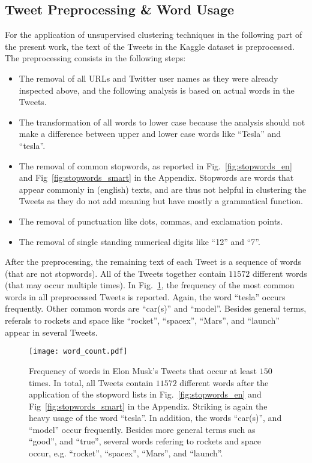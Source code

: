 \subsection{Tweet Preprocessing \& Word Usage}

For the application of unsupervised clustering techniques in the following part of the present work, the text of the Tweets in the Kaggle dataset is preprocessed. The preprocessing consists in the following steps:

\begin{itemize}
\item The removal of all URLs and Twitter user names as they were already inspected above, and the following analysis is based on actual words in the Tweets.
\item The transformation of all words to lower case because the analysis should not make a difference between upper and lower case words like \enquote{Tesla} and \enquote{tesla}.
\item The removal of common stopwords, as reported in Fig.~\ref{fig:stopwords_en} and Fig~\ref{fig:stopwords_smart} in the Appendix. Stopwords are words that appear commonly in (english) texts, and are thus not helpful in clustering the Tweets as they do not add meaning but have mostly a grammatical function.
\item The removal of punctuation like dots, commas, and exclamation points.	
\item The removal of single standing numerical digits like \enquote{12} and \enquote{7}.
\end{itemize}

After the preprocessing, the remaining text of each Tweet is a sequence of words (that are not stopwords). All of the Tweets together contain $11572$ different words (that may occur multiple times). In Fig.~\ref{fig:word_count}, the frequency of the most common words in all preprocessed Tweets is reported. Again, the word \enquote{tesla} occurs frequently. Other common words are \enquote{car(s)} and \enquote{model}. Besides general terms, referals to rockets and space like \enquote{rocket}, \enquote{spacex}, \enquote{Mars}, and \enquote{launch} appear in several Tweets.

\begin{figure}[h!]
\centering
\texttt{[image: word\_count.pdf]}
\caption{Frequency of words in Elon Musk's Tweets that occur at least $150$ times. In total, all Tweets contain $11572$ different words after the application of the stopword lists in Fig.~\ref{fig:stopwords_en} and Fig~\ref{fig:stopwords_smart} in the Appendix. Striking is again the heavy usage of the word \enquote{tesla}. In addition, the words \enquote{car(s)}, and \enquote{model} occur frequently. Besides more general terms such as \enquote{good}, and \enquote{true}, several words refering to rockets and space occur, e.g. \enquote{rocket}, \enquote{spacex}, \enquote{Mars}, and \enquote{launch}.}
\label{fig:word_count}
\end{figure}